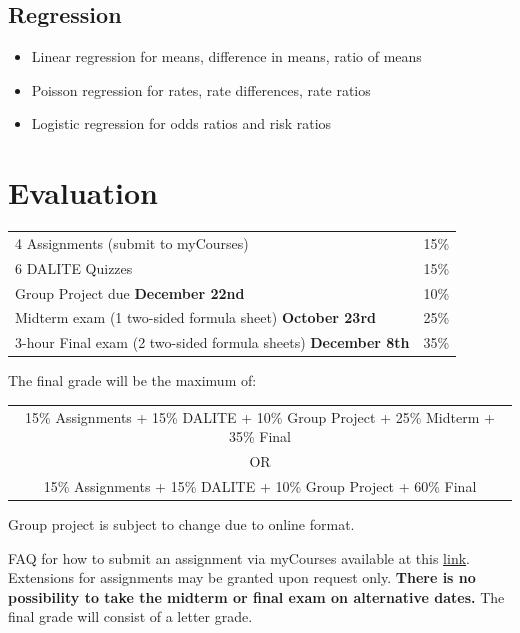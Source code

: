 \documentclass[]{article}
\begin{document}
\subsection{Regression}
\begin{itemize}
\item Linear regression for means, difference in means, ratio of means
\item Poisson regression for rates, rate differences, rate ratios
\item Logistic regression for odds ratios and risk ratios
\end{itemize}







\section{Evaluation}
\noindent
\begin{tabular}{lc}
4 Assignments (submit to myCourses) & 15\%\\
6 DALITE Quizzes & 15\%\\ 
Group Project due \textbf{December 22nd} & 10\%  \\
Midterm exam (1 two-sided formula sheet) \textbf{October 23rd} & 25\%  \\
3-hour Final exam (2 two-sided formula sheets) \textbf{December 8th}  & 35\%
\end{tabular}
\newline

The final grade will be the maximum of:\\

\vspace{.31cm}

\begin{tabular}{c}
	15\% Assignments + 15\% DALITE + 10\% Group Project + 25\% Midterm + 35\% Final\\
	OR\\
	15\% Assignments + 15\% DALITE + 10\% Group Project + 60\% Final
\end{tabular}

\vspace{.51cm}

Group project is subject to change due to online format.

\vspace{.51cm}

\noindent
FAQ for how to submit an assignment via myCourses available at this \href{http://kb.mcgill.ca/kb/?ArticleId=4337&source=Article&c=12&cid=2#tab:homeTab:crumb:8:artId:4337:src:article}{link}. Extensions for assignments may be granted upon request only. \textbf{There is no possibility to take the midterm or final exam on alternative dates.} The final grade will consist of a letter grade.
\end{document}
